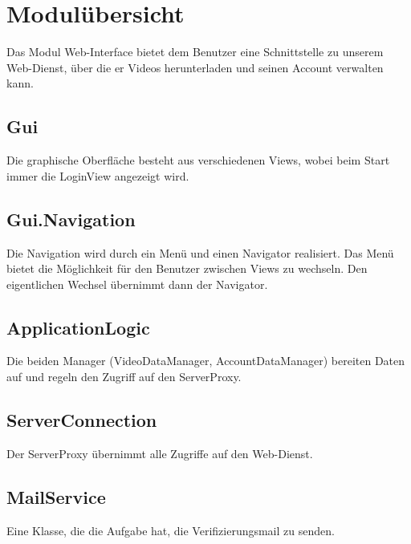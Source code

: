 \section{Modulübersicht} \label{interface:modul}
Das Modul Web-Interface bietet dem Benutzer eine Schnittstelle zu unserem Web-Dienst, über die er Videos herunterladen und seinen Account verwalten kann. 

\subsection{Gui}
Die graphische Oberfläche besteht aus verschiedenen Views, wobei beim Start immer die LoginView angezeigt wird.

\subsection{Gui.Navigation}
Die Navigation wird durch ein Menü und einen Navigator realisiert. Das Menü bietet die Möglichkeit für den Benutzer zwischen Views zu wechseln. Den eigentlichen Wechsel übernimmt dann der Navigator.

\subsection{ApplicationLogic}
Die beiden Manager (VideoDataManager, AccountDataManager) bereiten Daten auf und regeln den Zugriff auf den ServerProxy.

\subsection{ServerConnection}
Der ServerProxy übernimmt alle Zugriffe auf den Web-Dienst.

\subsection{MailService}
Eine Klasse, die die Aufgabe hat, die Verifizierungsmail zu senden.
\newpage
